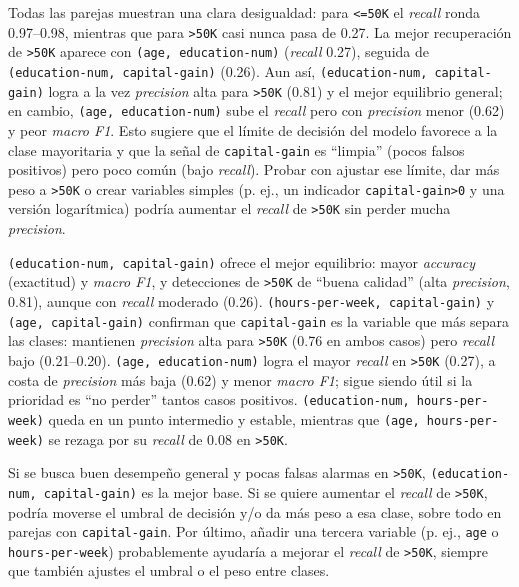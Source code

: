 \documentclass[12pt,a4paper]{article}
\begin{document}
\begin{enumerate}
\begin{itemize}
      Todas las parejas muestran una clara desigualdad: para \texttt{<=50K} el \emph{recall} ronda 0.97–0.98, mientras que para \texttt{>50K} casi nunca 
      pasa de 0.27. La mejor recuperación de \texttt{>50K} aparece con \texttt{(age, education-num)} (\emph{recall} 0.27), seguida de \texttt{(education-num, capital-gain)} 
      (0.26). Aun así, \texttt{(education-num, capital-gain)} logra a la vez \emph{precision} alta para \texttt{>50K} (0.81) y el mejor equilibrio general; en cambio, 
      \texttt{(age, education-num)} sube el \emph{recall} pero con \emph{precision} menor (0.62) y peor \emph{macro F1}. Esto sugiere que el límite de decisión del modelo 
      favorece a la clase mayoritaria y que la señal de \texttt{capital-gain} es “limpia” (pocos falsos positivos) pero poco común (bajo \emph{recall}). Probar con ajustar 
      ese límite, dar más peso a \texttt{>50K} o crear variables simples (p. ej., un indicador \texttt{capital-gain>0} y una versión logarítmica) podría aumentar el \emph{recall} 
      de \texttt{>50K} sin perder mucha \emph{precision}.

      \texttt{(education-num, capital-gain)} ofrece el mejor equilibrio: mayor \emph{accuracy} (exactitud) y \emph{macro F1}, y detecciones de \texttt{>50K} de 
      “buena calidad” (alta \emph{precision}, 0.81), aunque con \emph{recall} moderado (0.26). \texttt{(hours-per-week, capital-gain)} y \texttt{(age, capital-gain)} 
      confirman que \texttt{capital-gain} es la variable que más separa las clases: mantienen \emph{precision} alta para \texttt{>50K} (0.76 en ambos casos) pero 
      \emph{recall} bajo (0.21–0.20). \texttt{(age, education-num)} logra el mayor \emph{recall} en \texttt{>50K} (0.27), a costa de \emph{precision} más baja (0.62) y 
      menor \emph{macro F1}; sigue siendo útil si la prioridad es “no perder” tantos casos positivos. \texttt{(education-num, hours-per-week)} queda en un punto intermedio y 
      estable, mientras que \texttt{(age, hours-per-week)} se rezaga por su \emph{recall} de 0.08 en \texttt{>50K}.

      Si se busca buen desempeño general y pocas falsas alarmas en \texttt{>50K}, \texttt{(education-num, capital-gain)} es la mejor base.
      Si se quiere aumentar el \emph{recall} de \texttt{>50K}, podría moverse el umbral de decisión y/o da más peso a esa clase, sobre todo en parejas 
      con \texttt{capital-gain}. Por último, añadir una tercera variable (p. ej., \texttt{age} o \texttt{hours-per-week}) probablemente ayudaría a mejorar el 
      \emph{recall} de \texttt{>50K}, siempre que también ajustes el umbral o el peso entre clases.
    \end{itemize}


\end{enumerate}
\end{document}
